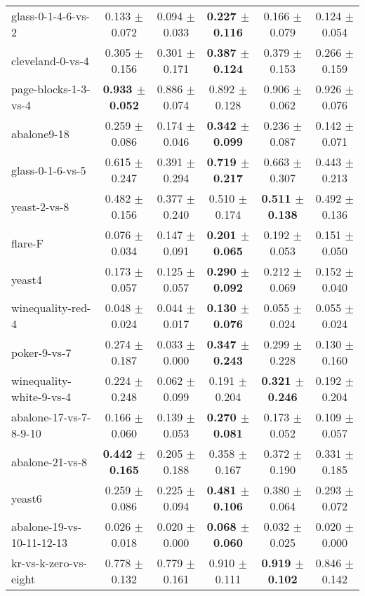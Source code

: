 \begin{table}[!ht]
{\begin{tabular}{l c c c c c}
glass-0-1-4-6-vs-2 & 0.133 $\pm$ 0.072 & 0.094 $\pm$ 0.033 & \textbf{0.227 $\pm$ 0.116} & 0.166 $\pm$ 0.079 & 0.124 $\pm$ 0.054 \\
cleveland-0-vs-4 & 0.305 $\pm$ 0.156 & 0.301 $\pm$ 0.171 & \textbf{0.387 $\pm$ 0.124} & 0.379 $\pm$ 0.153 & 0.266 $\pm$ 0.159 \\
page-blocks-1-3-vs-4 & \textbf{0.933 $\pm$ 0.052} & 0.886 $\pm$ 0.074 & 0.892 $\pm$ 0.128 & 0.906 $\pm$ 0.062 & 0.926 $\pm$ 0.076 \\
abalone9-18 & 0.259 $\pm$ 0.086 & 0.174 $\pm$ 0.046 & \textbf{0.342 $\pm$ 0.099} & 0.236 $\pm$ 0.087 & 0.142 $\pm$ 0.071 \\
glass-0-1-6-vs-5 & 0.615 $\pm$ 0.247 & 0.391 $\pm$ 0.294 & \textbf{0.719 $\pm$ 0.217} & 0.663 $\pm$ 0.307 & 0.443 $\pm$ 0.213 \\
yeast-2-vs-8 & 0.482 $\pm$ 0.156 & 0.377 $\pm$ 0.240 & 0.510 $\pm$ 0.174 & \textbf{0.511 $\pm$ 0.138} & 0.492 $\pm$ 0.136 \\
flare-F & 0.076 $\pm$ 0.034 & 0.147 $\pm$ 0.091 & \textbf{0.201 $\pm$ 0.065} & 0.192 $\pm$ 0.053 & 0.151 $\pm$ 0.050 \\
yeast4 & 0.173 $\pm$ 0.057 & 0.125 $\pm$ 0.057 & \textbf{0.290 $\pm$ 0.092} & 0.212 $\pm$ 0.069 & 0.152 $\pm$ 0.040 \\
winequality-red-4 & 0.048 $\pm$ 0.024 & 0.044 $\pm$ 0.017 & \textbf{0.130 $\pm$ 0.076} & 0.055 $\pm$ 0.024 & 0.055 $\pm$ 0.024 \\
poker-9-vs-7 & 0.274 $\pm$ 0.187 & 0.033 $\pm$ 0.000 & \textbf{0.347 $\pm$ 0.243} & 0.299 $\pm$ 0.228 & 0.130 $\pm$ 0.160 \\
winequality-white-9-vs-4 & 0.224 $\pm$ 0.248 & 0.062 $\pm$ 0.099 & 0.191 $\pm$ 0.204 & \textbf{0.321 $\pm$ 0.246} & 0.192 $\pm$ 0.204 \\
abalone-17-vs-7-8-9-10 & 0.166 $\pm$ 0.060 & 0.139 $\pm$ 0.053 & \textbf{0.270 $\pm$ 0.081} & 0.173 $\pm$ 0.052 & 0.109 $\pm$ 0.057 \\
abalone-21-vs-8 & \textbf{0.442 $\pm$ 0.165} & 0.205 $\pm$ 0.188 & 0.358 $\pm$ 0.167 & 0.372 $\pm$ 0.190 & 0.331 $\pm$ 0.185 \\
yeast6 & 0.259 $\pm$ 0.086 & 0.225 $\pm$ 0.094 & \textbf{0.481 $\pm$ 0.106} & 0.380 $\pm$ 0.064 & 0.293 $\pm$ 0.072 \\
abalone-19-vs-10-11-12-13 & 0.026 $\pm$ 0.018 & 0.020 $\pm$ 0.000 & \textbf{0.068 $\pm$ 0.060} & 0.032 $\pm$ 0.025 & 0.020 $\pm$ 0.000 \\
kr-vs-k-zero-vs-eight & 0.778 $\pm$ 0.132 & 0.779 $\pm$ 0.161 & 0.910 $\pm$ 0.111 & \textbf{0.919 $\pm$ 0.102} & 0.846 $\pm$ 0.142 \\

\end{tabular}}
\end{table}
